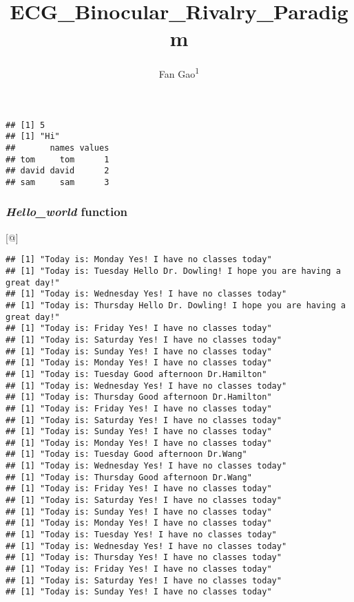 \documentclass[
  man]{apa6}
\title{ECG\_Binocular\_Rivalry\_Paradigm}
\author{Fan Gao\textsuperscript{1}}
\date{}
\affiliation{\vspace{0.5cm}\textsuperscript{1} University of Chicago}
\begin{document}
\maketitle

\begin{verbatim}
## [1] 5
## [1] "Hi"
##       names values
## tom     tom      1
## david david      2
## sam     sam      3
\end{verbatim}

\hypertarget{hello_world-function}{%
\subsubsection{\texorpdfstring{\emph{Hello\_world} function}{Hello\_world function}}\label{hello_world-function}}

{[}@{]}

\begin{verbatim}
## [1] "Today is: Monday Yes! I have no classes today"
## [1] "Today is: Tuesday Hello Dr. Dowling! I hope you are having a great day!"
## [1] "Today is: Wednesday Yes! I have no classes today"
## [1] "Today is: Thursday Hello Dr. Dowling! I hope you are having a great day!"
## [1] "Today is: Friday Yes! I have no classes today"
## [1] "Today is: Saturday Yes! I have no classes today"
## [1] "Today is: Sunday Yes! I have no classes today"
## [1] "Today is: Monday Yes! I have no classes today"
## [1] "Today is: Tuesday Good afternoon Dr.Hamilton"
## [1] "Today is: Wednesday Yes! I have no classes today"
## [1] "Today is: Thursday Good afternoon Dr.Hamilton"
## [1] "Today is: Friday Yes! I have no classes today"
## [1] "Today is: Saturday Yes! I have no classes today"
## [1] "Today is: Sunday Yes! I have no classes today"
## [1] "Today is: Monday Yes! I have no classes today"
## [1] "Today is: Tuesday Good afternoon Dr.Wang"
## [1] "Today is: Wednesday Yes! I have no classes today"
## [1] "Today is: Thursday Good afternoon Dr.Wang"
## [1] "Today is: Friday Yes! I have no classes today"
## [1] "Today is: Saturday Yes! I have no classes today"
## [1] "Today is: Sunday Yes! I have no classes today"
## [1] "Today is: Monday Yes! I have no classes today"
## [1] "Today is: Tuesday Yes! I have no classes today"
## [1] "Today is: Wednesday Yes! I have no classes today"
## [1] "Today is: Thursday Yes! I have no classes today"
## [1] "Today is: Friday Yes! I have no classes today"
## [1] "Today is: Saturday Yes! I have no classes today"
## [1] "Today is: Sunday Yes! I have no classes today"
\end{verbatim}
\end{document}
